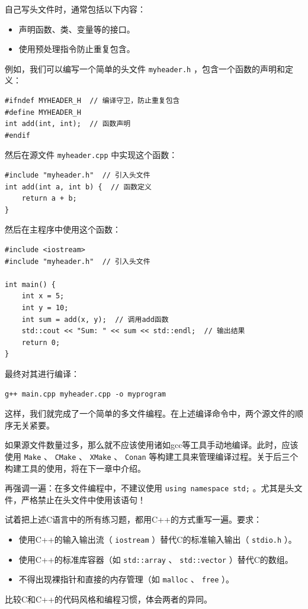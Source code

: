 自己写头文件时，通常包括以下内容：
\begin{itemize}
  \item 声明函数、类、变量等的接口。
  \item 使用预处理指令防止重复包含。
\end{itemize}
例如，我们可以编写一个简单的头文件 \texttt{myheader.h} ，包含一个函数的声明和定义：
\begin{verbatim}
#ifndef MYHEADER_H  // 编译守卫，防止重复包含
#define MYHEADER_H
int add(int, int);  // 函数声明
#endif
\end{verbatim}
然后在源文件 \texttt{myheader.cpp} 中实现这个函数：
\begin{verbatim}
#include "myheader.h"  // 引入头文件
int add(int a, int b) {  // 函数定义
    return a + b;
}
\end{verbatim}
然后在主程序中使用这个函数：
\begin{verbatim}
#include <iostream>
#include "myheader.h"  // 引入头文件

int main() {
    int x = 5;
    int y = 10;
    int sum = add(x, y);  // 调用add函数
    std::cout << "Sum: " << sum << std::endl;  // 输出结果
    return 0;
}
\end{verbatim}
最终对其进行编译：
\begin{verbatim}
g++ main.cpp myheader.cpp -o myprogram
\end{verbatim}
这样，我们就完成了一个简单的多文件编程。在上述编译命令中，两个源文件的顺序无关紧要。

如果源文件数量过多，那么就不应该使用诸如gcc等工具手动地编译。此时，应该使用 \texttt{Make} 、 \texttt{CMake} 、 \texttt{XMake} 、 \texttt{Conan} 等构建工具来管理编译过程。关于后三个构建工具的使用，将在下一章中介绍。

再强调一遍：在多文件编程中，不建议使用 \texttt{using namespace std;} 。尤其是头文件，严格禁止在头文件中使用该语句！

\begin{exercise}[重做]
    试着把上述C语言中的所有练习题，都用C++的方式重写一遍。要求：
    \begin{itemize}
        \item 使用C++的输入输出流（ \texttt{iostream} ）替代C的标准输入输出（ \texttt{stdio.h} ）。
        \item 使用C++的标准库容器（如 \texttt{std::array} 、 \texttt{std::vector} ）替代C的数组。
        \item 不得出现裸指针和直接的内存管理（如 \texttt{malloc} 、 \texttt{free} ）。
    \end{itemize}
    
    比较C和C++的代码风格和编程习惯，体会两者的异同。
\end{exercise}

